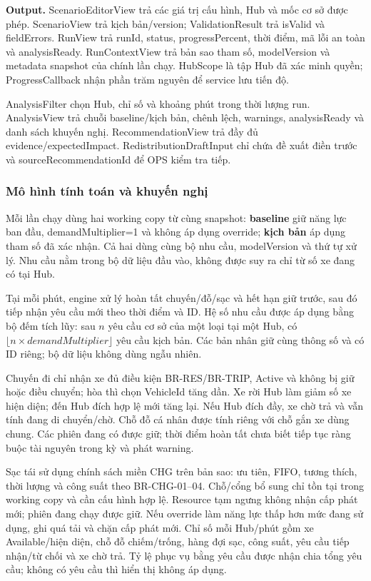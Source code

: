 \textbf{Output.} ScenarioEditorView trả các giá trị cấu hình, Hub và mốc cơ sở được phép. ScenarioView trả kịch bản/version; ValidationResult trả isValid và fieldErrors. RunView trả runId, status, progressPercent, thời điểm, mã lỗi an toàn và analysisReady. RunContextView trả bản sao tham số, modelVersion và metadata snapshot của chính lần chạy. HubScope là tập Hub đã xác minh quyền; ProgressCallback nhận phần trăm nguyên để service lưu tiến độ.

AnalysisFilter chọn Hub, chỉ số và khoảng phút trong thời lượng run. AnalysisView trả chuỗi baseline/kịch bản, chênh lệch, warnings, analysisReady và danh sách khuyến nghị. RecommendationView trả đầy đủ evidence/expectedImpact. RedistributionDraftInput chỉ chứa đề xuất điền trước và sourceRecommendationId để OPS kiểm tra tiếp.

\subsubsection{Mô hình tính toán và khuyến nghị}
Mỗi lần chạy dùng hai working copy từ cùng snapshot: \textbf{baseline} giữ năng lực ban đầu, demandMultiplier=1 và không áp dụng override; \textbf{kịch bản} áp dụng tham số đã xác nhận. Cả hai dùng cùng bộ nhu cầu, modelVersion và thứ tự xử lý. Nhu cầu nằm trong bộ dữ liệu đầu vào, không được suy ra chỉ từ số xe đang có tại Hub.

Tại mỗi phút, engine xử lý hoàn tất chuyến/đỗ/sạc và hết hạn giữ trước, sau đó tiếp nhận yêu cầu mới theo thời điểm và ID. Hệ số nhu cầu được áp dụng bằng bộ đếm tích lũy: sau $n$ yêu cầu cơ sở của một loại tại một Hub, có $\lfloor n \times demandMultiplier \rfloor$ yêu cầu kịch bản. Các bản nhân giữ cùng thông số và có ID riêng; bộ dữ liệu không dùng ngẫu nhiên.

Chuyến đi chỉ nhận xe đủ điều kiện BR-RES/BR-TRIP, Active và không bị giữ hoặc điều chuyển; hòa thì chọn VehicleId tăng dần. Xe rời Hub làm giảm số xe hiện diện; đến Hub đích hợp lệ mới tăng lại. Nếu Hub đích đầy, xe chờ trả và vẫn tính đang di chuyển/chờ. Chỗ đỗ cá nhân được tính riêng với chỗ gắn xe dùng chung. Các phiên đang có được giữ; thời điểm hoàn tất chưa biết tiếp tục ràng buộc tài nguyên trong kỳ và phát warning.

Sạc tái sử dụng chính sách miền CHG trên bản sao: ưu tiên, FIFO, tương thích, thời lượng và công suất theo BR-CHG-01--04. Chỗ/cổng bổ sung chỉ tồn tại trong working copy và cần cấu hình hợp lệ. Resource tạm ngưng không nhận cấp phát mới; phiên đang chạy được giữ. Nếu override làm năng lực thấp hơn mức đang sử dụng, ghi quá tải và chặn cấp phát mới. Chỉ số mỗi Hub/phút gồm xe Available/hiện diện, chỗ đỗ chiếm/trống, hàng đợi sạc, công suất, yêu cầu tiếp nhận/từ chối và xe chờ trả. Tỷ lệ phục vụ bằng yêu cầu được nhận chia tổng yêu cầu; không có yêu cầu thì hiển thị không áp dụng.

